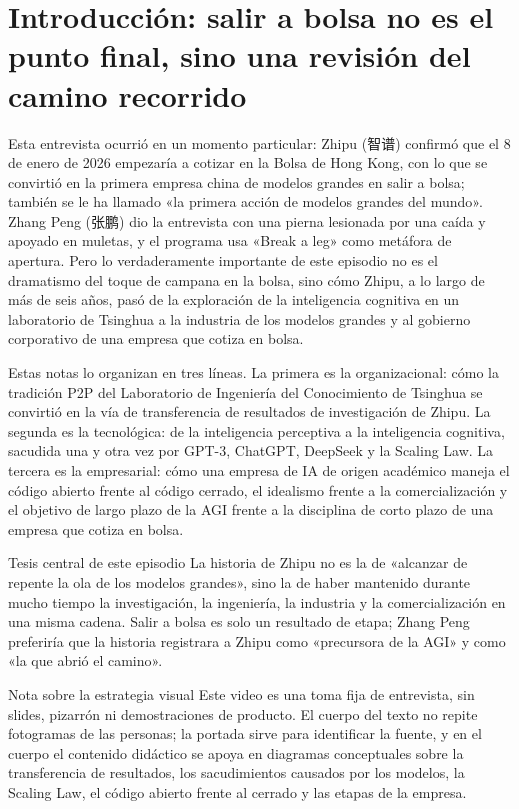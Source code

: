 \section{Introducción: salir a bolsa no es el punto final, sino una revisión del camino recorrido}

Esta entrevista ocurrió en un momento particular: Zhipu (智谱) confirmó que el 8 de enero de 2026 empezaría a cotizar en la Bolsa de Hong Kong, con lo que se convirtió en la primera empresa china de modelos grandes en salir a bolsa; también se le ha llamado «la primera acción de modelos grandes del mundo». Zhang Peng (张鹏) dio la entrevista con una pierna lesionada por una caída y apoyado en muletas, y el programa usa «Break a leg» como metáfora de apertura. Pero lo verdaderamente importante de este episodio no es el dramatismo del toque de campana en la bolsa, sino cómo Zhipu, a lo largo de más de seis años, pasó de la exploración de la inteligencia cognitiva en un laboratorio de Tsinghua a la industria de los modelos grandes y al gobierno corporativo de una empresa que cotiza en bolsa.

Estas notas lo organizan en tres líneas. La primera es la organizacional: cómo la tradición P2P del Laboratorio de Ingeniería del Conocimiento de Tsinghua se convirtió en la vía de transferencia de resultados de investigación de Zhipu. La segunda es la tecnológica: de la inteligencia perceptiva a la inteligencia cognitiva, sacudida una y otra vez por GPT-3, ChatGPT, DeepSeek y la Scaling Law. La tercera es la empresarial: cómo una empresa de IA de origen académico maneja el código abierto frente al código cerrado, el idealismo frente a la comercialización y el objetivo de largo plazo de la AGI frente a la disciplina de corto plazo de una empresa que cotiza en bolsa.

\begin{importantbox}{Tesis central de este episodio}
La historia de Zhipu no es la de «alcanzar de repente la ola de los modelos grandes», sino la de haber mantenido durante mucho tiempo la investigación, la ingeniería, la industria y la comercialización en una misma cadena. Salir a bolsa es solo un resultado de etapa; Zhang Peng preferiría que la historia registrara a Zhipu como «precursora de la AGI» y como «la que abrió el camino».
\end{importantbox}

\begin{knowledgebox}{Nota sobre la estrategia visual}
Este video es una toma fija de entrevista, sin slides, pizarrón ni demostraciones de producto. El cuerpo del texto no repite fotogramas de las personas; la portada sirve para identificar la fuente, y en el cuerpo el contenido didáctico se apoya en diagramas conceptuales sobre la transferencia de resultados, los sacudimientos causados por los modelos, la Scaling Law, el código abierto frente al cerrado y las etapas de la empresa.
\end{knowledgebox}

